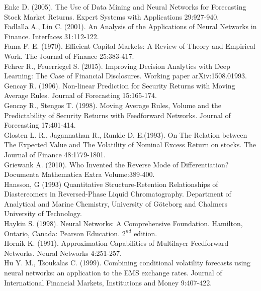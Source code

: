 \documentclass[12pt, letterpaper]{amsart}%
\begin{document}
Enke D. (2005). The Use of Data Mining and Neural Networks for Forecasting Stock Market Returns. Expert Systems with Applications 29:927-940.
\\

Fadlalla A., Lin C. (2001). An Analysis of the Applications of Neural Networks in Finance. Interfaces 31:112-122.
\\

Fama F. E. (1970). Efficient Capital Markets: A Review of Theory and Empirical Work. The Journal of Finance 25:383-417.
\\

Fehrer R., Feuerriegel S. (2015). Improving Decision Analytics with Deep Learning: The
Case of Financial Disclosures. Working paper arXiv:1508.01993.
\\

Gencay R. (1996). Non-linear Prediction for Security Returns with Moving Average Rules. Journal of Forecasting 15:165-174.
\\

Gencay R., Stengos T. (1998). Moving Average Rules, Volume and the Predictability of Security Returns with Feedforward Networks. Journal of Forecasting 17:401-414.
\\

Glosten L. R., Jagannathan R., Runkle D. E.(1993). On The Relation between The Expected Value and The Volatility of Nominal Excess Return on stocks. The Journal of Finance 48:1779-1801.
\\

Griewank A. (2010). Who Invented the Reverse Mode of Differentiation? Documenta Mathematica Extra Volume:389-400.
\\

Hansson, G (1993) Quantitative Structure-Retention Relationships of Diastereomers in Reversed-Phase Liquid Chromatography. Department of Analytical and Marine Chemistry, University of Göteborg and Chalmers University of Technology.
\\

Haykin S. (1998). Neural Networks: A Comprehensive Foundation. Hamilton, Ontario, Canada: Pearson Education. $2^{nd}$ edition.
\\

Hornik K. (1991). Approximation Capabilities of Multilayer Feedforward Networks. Neural Networks 4:251-257.
\\

Hu Y. M., Tsoukalas C. (1999). Combining conditional volatility forecasts using neural networks: an application to the EMS exchange rates. Journal of International Financial Markets, Institutions and Money 9:407-422.
\\
\end{document}
